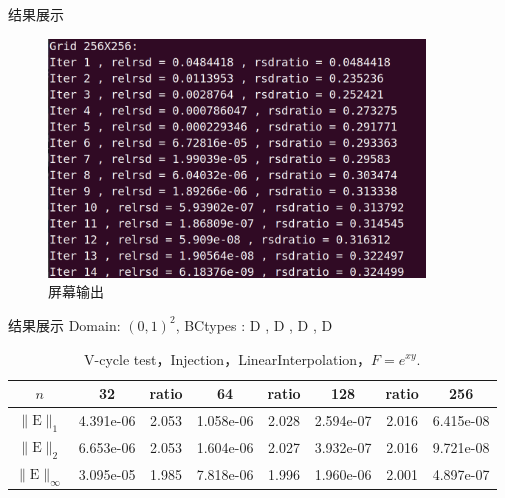 \documentclass{beamer}
\begin{document}
      \begin{frame}{结果展示}
    \begin{figure}[!htp]                                                                       
  \centering                                                                           
  \includegraphics[width=10cm]{result1.png}                                           
  \caption{屏幕输出}                        
\end{figure}
   
\end{frame}

\begin{frame}{结果展示}
   \noindent Domain: $(0,1)^2$, BCtypes : D , D , D , D
  \begin{table}[htbp]
    \setlength\tabcolsep{2.5pt}
\centering\begin{tabular}{c|ccccccc}
\hline
$n$&32&ratio&64&ratio&128&ratio&256\\
\hline
$\|\mathrm{E}\|_1$&4.391e-06&2.053&1.058e-06&2.028&2.594e-07&2.016&6.415e-08\\
\hline
$\|\mathrm{E}\|_2$&6.653e-06&2.053&1.604e-06&2.027&3.932e-07&2.016&9.721e-08\\
\hline
$\|\mathrm{E}\|_{\infty}$&3.095e-05&1.985&7.818e-06&1.996&1.960e-06&2.001&4.897e-07\\
\hline
\end{tabular}
\caption{V-cycle test，Injection，LinearInterpolation，$F=e^{xy}$.}
\end{table} 
\end{frame}
\end{document}

